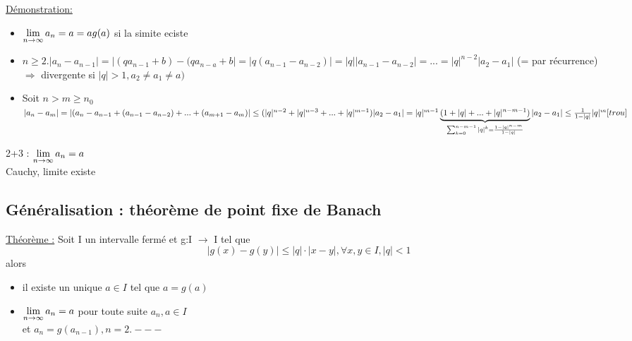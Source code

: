 \documentclass[12pt,a4paper]{article}
\begin{document}
{\underline{Démonstration:}
\begin{itemize}
\item $\lim\limits_{n \to \infty} a_n = a = ag(a)$ si la simite eciste
\item $n \geq 2. |a_n-a_{n-1}| = |(qa_{n-1}+b) - (qa_{n-a}+b| = |q(a_{n-1}-a_{n-2})| = |q||a_{n-1} - a_{n-2}| = ... = |q|^{n-2}|a_2-a_1|$ (= par récurrence) \\
$\Rightarrow$ divergente si $|q| > 1, a_2  \neq a_1 \neq a)$
\item Soit $n > m \geq n_0 $\\
$|a_n - a_m| = |(a_n - a_{n-1} + (a_{n-1}-a_{n-2}) + ... + (a_{m+1}-a_m)|\\
 \leq (|q|^{n-2} + |q|^{n-3} + ... + |q|^{m-1})|a_2-a_1|\\
 =|q|^{m-1}\underbrace{(1+|q|+...+|q|^{n-m-1})}_{\mathclap{\sum_{k=0}^{n-m-1} |q|^k = \frac{1-|q|^{n-m}}{1-|q|}}}|a_2-a_1|\\
 \leq \frac{1}{1-|q|} |q|^m[trou]$
\end{itemize}
2+3 : $\lim\limits_{n \to \infty} a_n = a$\\
Cauchy, limite existe
\subsection{Généralisation : théorème de point fixe de Banach}
\begin{boite}
\underline{Théorème :} Soit I un intervalle fermé et g:I $\to$ I tel que 
\begin{equation}
|g(x) - g(y)| \leq |q|\cdot|x-y|, \forall x,y \in I, |q| < 1
\end{equation}
alors \begin{itemize}
\item il existe un unique $a \in I$ tel que $a = g(a)$
\item $\lim\limits_{n \to \infty}a_n = a$ pour toute suite $a_n, a \in I$\\
et $a_n = g(a_{n-1}), n = 2.---$
\end{itemize}
\end{boite}	
}
\end{document}

